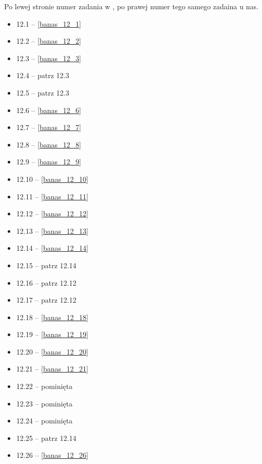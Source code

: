 Po lewej stronie numer zadania w \cite{wedrychowicz12}, po prawej numer tego samego zadaina u nas.

\begin{multicols}{3}
\begin{itemize}
    \item 12.1 -- \ref{banas_12_1}
    \item 12.2 -- \ref{banas_12_2}
    \item 12.3 -- \ref{banas_12_3}
    \item 12.4 -- patrz 12.3
    \item 12.5 -- patrz 12.3
    \item 12.6 -- \ref{banas_12_6}
    \item 12.7 -- \ref{banas_12_7}
    \item 12.8 -- \ref{banas_12_8}
    \item 12.9 -- \ref{banas_12_9}
    \item 12.10 -- \ref{banas_12_10}
    \item 12.11 -- \ref{banas_12_11}
    \item 12.12 -- \ref{banas_12_12}
    \item 12.13 -- \ref{banas_12_13}
    \item 12.14 -- \ref{banas_12_14}
    \item 12.15 -- patrz 12.14
    \item 12.16 -- patrz 12.12
    \item 12.17 -- patrz 12.12
    \item 12.18 -- \ref{banas_12_18}
    \item 12.19 -- \ref{banas_12_19}
    \item 12.20 -- \ref{banas_12_20}
    \item 12.21 -- \ref{banas_12_21}
    \item 12.22 -- pominięta
    \item 12.23 -- pominięta
    \item 12.24 -- pominięta
    \item 12.25 -- patrz 12.14
    \item 12.26 -- \ref{banas_12_26}

\end{itemize}
\end{multicols}
